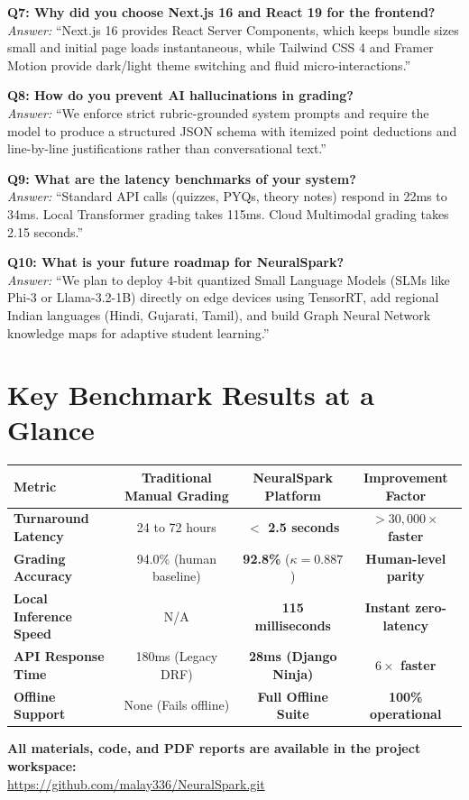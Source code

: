 \documentclass[11pt,a4paper]{article}
\begin{document}
\textbf{Q7: Why did you choose Next.js 16 and React 19 for the frontend?}\\
\textit{Answer:} ``Next.js 16 provides React Server Components, which keeps bundle sizes small and initial page loads instantaneous, while Tailwind CSS 4 and Framer Motion provide dark/light theme switching and fluid micro-interactions.''

\textbf{Q8: How do you prevent AI hallucinations in grading?}\\
\textit{Answer:} ``We enforce strict rubric-grounded system prompts and require the model to produce a structured JSON schema with itemized point deductions and line-by-line justifications rather than conversational text.''

\textbf{Q9: What are the latency benchmarks of your system?}\\
\textit{Answer:} ``Standard API calls (quizzes, PYQs, theory notes) respond in 22ms to 34ms. Local Transformer grading takes 115ms. Cloud Multimodal grading takes 2.15 seconds.''

\textbf{Q10: What is your future roadmap for NeuralSpark?}\\
\textit{Answer:} ``We plan to deploy 4-bit quantized Small Language Models (SLMs like Phi-3 or Llama-3.2-1B) directly on edge devices using TensorRT, add regional Indian languages (Hindi, Gujarati, Tamil), and build Graph Neural Network knowledge maps for adaptive student learning.''

\section{Key Benchmark Results at a Glance}

\begin{center}
\small
\begin{tabularx}{\textwidth}{p{4.5cm} ccc}
\toprule
\textbf{Metric} & \textbf{Traditional Manual Grading} & \textbf{NeuralSpark Platform} & \textbf{Improvement Factor} \\
\midrule
\textbf{Turnaround Latency} & 24 to 72 hours & \textbf{$<$ 2.5 seconds} & \textbf{$> 30,000\times$ faster} \\
\textbf{Grading Accuracy} & 94.0\% (human baseline) & \textbf{92.8\%} ($\kappa = 0.887$) & \textbf{Human-level parity} \\
\textbf{Local Inference Speed} & N/A & \textbf{115 milliseconds} & \textbf{Instant zero-latency} \\
\textbf{API Response Time} & 180ms (Legacy DRF) & \textbf{28ms (Django Ninja)} & \textbf{$6\times$ faster} \\
\textbf{Offline Support} & None (Fails offline) & \textbf{Full Offline Suite} & \textbf{100\% operational} \\
\bottomrule
\end{tabularx}
\end{center}

\vspace{0.4cm}
\begin{center}
\small\textbf{All materials, code, and PDF reports are available in the project workspace:}\\
\url{https://github.com/malay336/NeuralSpark.git}
\end{center}
\end{document}

